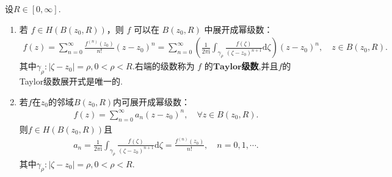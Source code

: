 \documentclass[../../main.tex]{subfiles}%
\begin{document}
\begin{theorem}[Taylor定理]\label{theorem:全纯函数的Taylor展开}
设$R\in [0,\infty]$.
\begin{enumerate}[(1)]
\item 若 \( f \in H(B(z_0,R)) \)，则 \( f \) 可以在 \( B(z_0,R) \) 中展开成幂级数：
\begin{align}
f(z)=\sum_{n=0}^{\infty}{\frac{f^{(n)}(z_0)}{n!}\left( z-z_0 \right) ^n}=\sum_{n=0}^{\infty}{\left( \frac{1}{2\pi \mathrm{i}}\int_{\gamma _{\rho}}{\frac{f\left( \zeta \right)}{\left( \zeta -z_0 \right) ^{n+1}}\mathrm{d}\zeta} \right) \left( z-z_0 \right) ^n},\quad z\in B(z_0,R).\label{eq:taylor312412342}
\end{align}
其中$\gamma _{\rho}:\left| \zeta -z_0 \right|=\rho ,0<\rho <R.$右端的级数称为 \( f \) 的$\mathbf{Taylor}$\textbf{级数},并且$f$的Taylor级数展开式是唯一的.

\item 若\( f \)在\( z_0 \)的邻域$B(z_0, R)$内可展开成幂级数：
\begin{align*}
f(z) = \sum_{n=0}^{\infty} a_n (z - z_0)^n, \quad \forall z \in B(z_0, R).
\end{align*}
则\( f \in H(B(z_0, R))\)且
\begin{align*}
a_n=\frac{1}{2\pi \mathrm{i}}\int_{\gamma _{\rho}}{\frac{f\left( \zeta \right)}{\left( \zeta -z_0 \right) ^{n+1}}\mathrm{d}\zeta}=\frac{f^{(n)}(z_0)}{n!},\quad n=0,1,\cdots .
\end{align*}
其中$\gamma _{\rho}:\left| \zeta -z_0 \right|=\rho ,0<\rho <R.$
\end{enumerate}
\end{theorem}
\end{document}
